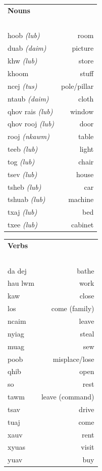 \documentclass{article}
\begin{document}
\begin{multicols}{2}
[
\section*{}
]

\begin{tabular}{l r}
\textbf{Nouns} \\
~\\
hoob {\em (lub)} &room\\
duab {\em (daim)} &picture\\
khw {\em (lub)} &store\\
khoom &stuff\\
ncej {\em (tus)} &pole/pillar\\
ntaub {\em (daim)} &cloth\\
qhov rais {\em (lub)} &window\\
qhov rooj {\em (lub)} &door\\
rooj {\em (nkawm)} &table\\
teeb {\em (lub)} &light\\
tog {\em (lub)} &chair\\
tsev {\em (lub)} &house\\
tsheb {\em (lub)} &car\\
tshuab {\em (lub)} &machine\\
txaj {\em (lub)} &bed\\
txee {\em (lub)} &cabinet\\
\end{tabular}

\begin{tabular}{l r}
\textbf{Verbs} \\
~\\
da dej &bathe\\
hau lwm &work\\
kaw &close\\
los &come (family)\\
ncaim &leave\\
nyiag &steal\\
muag &sew\\
poob &misplace/lose\\
qhib &open\\
so &rest\\
tawm &leave (command)\\
tsav &drive\\
tuaj &come\\
xauv &rent\\
xyuas &visit\\
yuav &buy\\
\end{tabular}
\end{multicols}
\end{document}
